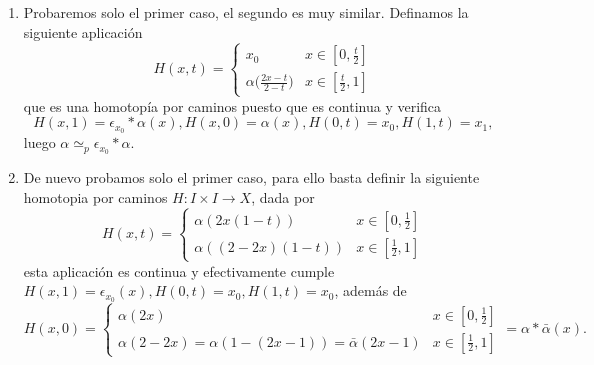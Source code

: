 {\begin{enumerate}
        \item Probaremos solo el primer caso, el segundo es muy similar. Definamos la siguiente aplicación 
        \[
        H(x,t) = \begin{cases}
            x_0 & x \in [0, \frac{t}{2}] \\
            \alpha\Big(\frac{2x-t}{2-t}\Big) & x \in [\frac{t}{2}, 1]
        \end{cases}
        \]
        que es una homotopía por caminos puesto que es continua y verifica
        \[
        H(x,1)=\epsilon_{x_0} * \alpha(x), H(x,0)=\alpha(x), H(0,t)=x_0, H(1,t)=x_1,
        \]
        luego $\alpha\simeq_p\epsilon_{x_0} * \alpha$.

        \item De nuevo probamos solo el primer caso, para ello basta definir la siguiente homotopia por caminos $H:I\times I\to X$, dada por
        \[
            H(x, t) = 
            \begin{cases} 
            \alpha(2x(1-t)) & x \in [0, \frac{1}{2}] \\
            \alpha((2-2x)(1-t)) & x \in [\frac{1}{2}, 1]
            \end{cases}
        \]
        esta aplicación es continua y efectivamente cumple $H(x,1)=\epsilon_{x_0}(x), H(0,t)=x_0, H(1,t)=x_0$, además de
        \[
        H(x,0)=
        \begin{cases} 
            \alpha(2x) & x \in [0, \frac{1}{2}] \\
            \alpha(2-2x)=\alpha(1-(2x-1))=\bar{\alpha}(2x-1) & x \in [\frac{1}{2}, 1]
            \end{cases}
        =\alpha * \bar{\alpha}(x).
        \]
    \end{enumerate}
}


